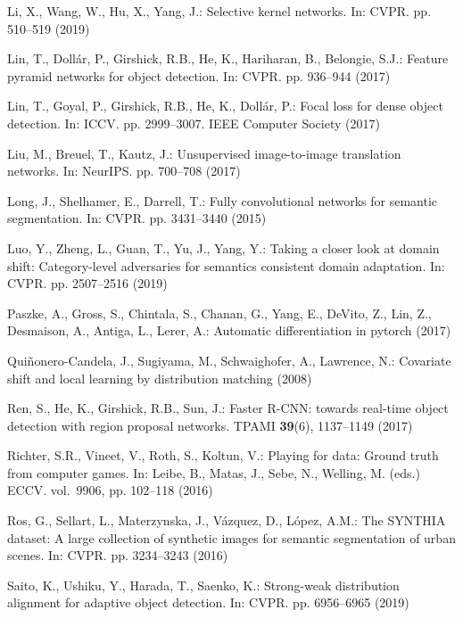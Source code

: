 \documentclass[runningheads]{llncs}
\begin{document}
\begin{thebibliography}{10}
Li, X., Wang, W., Hu, X., Yang, J.: Selective kernel networks. In: CVPR. pp.
  510--519 (2019)

Lin, T., Doll{\'{a}}r, P., Girshick, R.B., He, K., Hariharan, B., Belongie,
  S.J.: Feature pyramid networks for object detection. In: CVPR. pp. 936--944
  (2017)

Lin, T., Goyal, P., Girshick, R.B., He, K., Doll{\'{a}}r, P.: Focal loss for
  dense object detection. In: ICCV. pp. 2999--3007. {IEEE} Computer Society
  (2017)

Liu, M., Breuel, T., Kautz, J.: Unsupervised image-to-image translation
  networks. In: NeurIPS. pp. 700--708 (2017)

Long, J., Shelhamer, E., Darrell, T.: Fully convolutional networks for semantic
  segmentation. In: CVPR. pp. 3431--3440 (2015)

Luo, Y., Zheng, L., Guan, T., Yu, J., Yang, Y.: Taking a closer look at domain
  shift: Category-level adversaries for semantics consistent domain adaptation.
  In: CVPR. pp. 2507--2516 (2019)

Paszke, A., Gross, S., Chintala, S., Chanan, G., Yang, E., DeVito, Z., Lin, Z.,
  Desmaison, A., Antiga, L., Lerer, A.: Automatic differentiation in pytorch
  (2017)

Qui{\~n}onero-Candela, J., Sugiyama, M., Schwaighofer, A., Lawrence, N.:
  Covariate shift and local learning by distribution matching (2008)

Ren, S., He, K., Girshick, R.B., Sun, J.: Faster {R-CNN:} towards real-time
  object detection with region proposal networks. TPAMI  \textbf{39}(6),
  1137--1149 (2017)

Richter, S.R., Vineet, V., Roth, S., Koltun, V.: Playing for data: Ground truth
  from computer games. In: Leibe, B., Matas, J., Sebe, N., Welling, M. (eds.)
  ECCV. vol.~9906, pp. 102--118 (2016)

Ros, G., Sellart, L., Materzynska, J., V{\'{a}}zquez, D., L{\'{o}}pez, A.M.:
  The {SYNTHIA} dataset: {A} large collection of synthetic images for semantic
  segmentation of urban scenes. In: CVPR. pp. 3234--3243 (2016)

Saito, K., Ushiku, Y., Harada, T., Saenko, K.: Strong-weak distribution
  alignment for adaptive object detection. In: CVPR. pp. 6956--6965 (2019)


\end{thebibliography}
\end{document}
